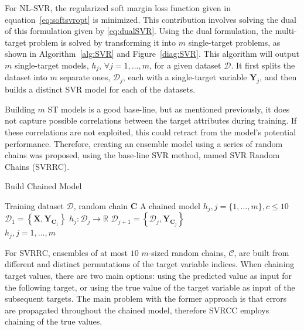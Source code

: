 \documentclass[reqno]{vcuthesis}
\newcommand{\set}[1]{{\left\{#1\right\}}}
\numberwithin{equation}{chapter}
\begin{document}
For NL-SVR, the regularized soft margin loss function given in equation~\eqref{eq:softsvropt} is minimized. This contribution involves solving the dual of this formulation given by \eqref{eq:dualSVR}. Using the dual formulation, the multi-target problem is solved by transforming it into $m$ single-target problems, as shown in Algorithm~\ref{alg:SVR} and Figure~\ref{diag:SVR}. This algorithm will output $m$ single-target models, $h_j,\,\forall j = 1,\ldots,m$, for a given dataset $\mathcal{D}$. It first splits the dataset into $m$ separate ones, $\mathcal{D}_j$, each with a single-target variable $\bm Y_j$, and then builds a distinct SVR model for each of the datasets. 

Building $m$ ST models is a good base-line, but as mentioned previously, it does not capture possible correlations between the target attributes during training. If these correlations are not exploited, this could retract from the model's potential performance. Therefore, creating an ensemble model using a series of random chains was proposed, using the base-line SVR method, named SVR Random Chains (SVRRC). 
\begin{algorithm}[t!]
\centering \small
\caption{Build Chained Model}
\label{alg:buildchainedmodel} 
\begin{algorithmic}[1]
\renewcommand{\algorithmicrequire}{\textbf{Input:}}
\renewcommand{\algorithmicensure}{\textbf{Output:}}
\Require Training dataset $\mathcal{D}$, random chain $\bm C$
\Ensure  A chained model $h_j, j = \{1,\ldots,m\}, c \leq 10$
\State $\mathcal{D}_1 = \set{\bm X, \bm Y_{\bm C_1}}$ 
 
\State $h_j : \mathcal{D}_j \rightarrow \mathbb{R}$ 
\State $\mathcal{D}_{j+1} = \set{\mathcal{D}_j, \bm Y_{\bm C_j}}$ 
\EndIf
\EndFor \\
\Return $h_j, j=1,\ldots,m$ 
\end{algorithmic} 
\end{algorithm}

For SVRRC, ensembles of at most $10$ $m$-sized random chains, $\mathcal{C}$, are built from different and distinct permutations of the target variable indices. When chaining target values, there are two main options: using the predicted value as input for the following target, or using the true value of the target variable as input of the subsequent targets. The main problem with the former approach is that errors are propagated throughout the chained model, therefore SVRCC employs chaining of the true values. 
\end{document}
